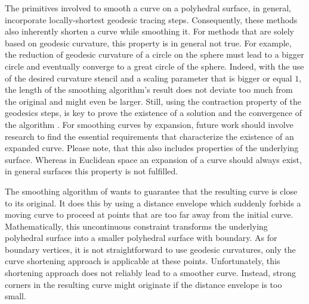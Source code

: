 \documentclass[crop=false]{stdlocal}
\begin{document}
  The primitives involved to smooth a curve on a polyhedral surface, in general, incorporate locally-shortest geodesic tracing steps.
  Consequently, these methods also inherently shorten a curve while smoothing it.
  For methods that are solely based on geodesic curvature, this property is in general not true.
  For example, the reduction of geodesic curvature of a circle on the sphere must lead to a bigger circle and eventually converge to a great circle of the sphere.
  Indeed, with the use of the desired curvature stencil and a scaling parameter that is bigger or equal $1$, the length of the smoothing algorithm's result does not deviate too much from the original and might even be larger.
  Still, using the contraction property of the geodesics steps, is key to prove the existence of a solution and the convergence of the algorithm \autocite{martinez2005,lawonn2014}.
  For smoothing curves by expansion, future work should involve research to find the essential requirements that characterize the existence of an expanded curve.
  Please note, that this also includes properties of the underlying surface.
  Whereas in Euclidean space an expansion of a curve should always exist, in general surfaces this property is not fulfilled.

  The smoothing algorithm of \textcite{lawonn2014} wants to guarantee that the resulting curve is close to its original.
  It does this by using a distance envelope which suddenly forbids a moving curve to proceed at points that are too far away from the initial curve.
  Mathematically, this uncontinuous constraint transforms the underlying polyhedral surface into a smaller polyhedral surface with boundary.
  As for boundary vertices, it is not straightforward to use geodesic curvatures, only the curve shortening approach is applicable at these points.
  Unfortunately, this shortening approach does not reliably lead to a smoother curve.
  Instead, strong corners in the resulting curve might originate if the distance envelope is too small.
\end{document}
